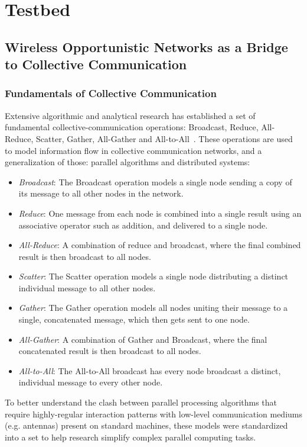 \chapter{Testbed}
\label{chap:testbed}
\section{Wireless Opportunistic Networks as a Bridge to Collective Communication}
\subsection{Fundamentals of Collective Communication}
Extensive algorithmic and analytical research has established a set of fundamental collective-communication operations: Broadcast, Reduce, All-Reduce, Scatter, Gather, All-Gather and All-to-All~\cite{Sanders2019}.
These operations are used to model information flow in collective communication networks, and a generalization of those: parallel algorithms and distributed systems:\begin{itemize}
\item \emph{Broadcast}: The Broadcast operation models a single node sending a copy of its message to all other nodes in the network.
\item \emph{Reduce}: One message from each node is combined into a single result using an associative operator such as addition, and delivered to a single node.
\item \emph{All-Reduce}: A combination of reduce and broadcast, where the final combined result is then broadcast to all nodes.
\item \emph{Scatter}: The Scatter operation models a single node distributing a distinct individual message to all other nodes.
\item \emph{Gather}: The Gather operation models all nodes uniting their message to a single, concatenated message, which then gets sent to one node.
\item \emph{All-Gather}: A combination of Gather and Broadcast, where the final concatenated result is then broadcast to all nodes.
\item \emph{All-to-All}: The All-to-All broadcast has every node broadcast a distinct, individual message to every other node.
\end{itemize}
To better understand the clash between parallel processing algorithms that require highly-regular interaction patterns with low-level communication mediums (e.g. antennas) present on standard machines, these models were standardized into a set to help research simplify complex parallel computing tasks.
